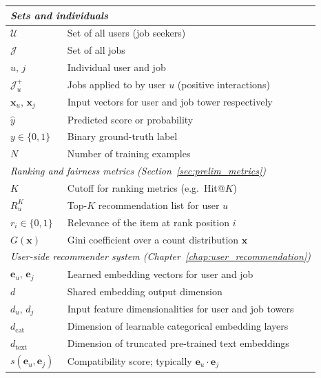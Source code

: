 \begin{longtable}{@{}ll@{}}
    \multicolumn{2}{l}{\textit{Sets and individuals}} \\
    \midrule
    $\mathcal{U}$                  & Set of all users (job seekers) \\
    $\mathcal{J}$                  & Set of all jobs \\
    $u,\, j$                       & Individual user and job \\
    $\mathcal{J}^{+}_u$            & Jobs applied to by user $u$ (positive interactions) \\
    $\mathbf{x}_u,\,\mathbf{x}_j$  & Input vectors for user and job tower respectively \\
    $\hat{y}$                      & Predicted score or probability \\
    $y \in \{0,1\}$                & Binary ground-truth label \\
    $N$                            & Number of training examples \\
    \midrule
    \multicolumn{2}{l}{\textit{Ranking and fairness metrics
        (Section~\ref{sec:prelim_metrics})}} \\
    \midrule
    $K$                            & Cutoff for ranking metrics (e.g.\ Hit@$K$) \\
    $R_u^K$                        & Top-$K$ recommendation list for user $u$ \\
    $r_i \in \{0,1\}$              & Relevance of the item at rank position $i$ \\
    $G(\mathbf{x})$                & Gini coefficient over a count distribution $\mathbf{x}$ \\
    \midrule
    \multicolumn{2}{l}{\textit{User-side recommender system
        (Chapter~\ref{chap:user_recommendation})}} \\
    \midrule
    $\mathbf{e}_u,\,\mathbf{e}_j$  & Learned embedding vectors for user and job \\
    $d$                            & Shared embedding output dimension \\
    $d_u,\,d_j$                    & Input feature dimensionalities for user and job towers \\
    $d_{\text{cat}}$               & Dimension of learnable categorical embedding layers \\
    $d_{\text{text}}$              & Dimension of truncated pre-trained text embeddings \\
    $s(\mathbf{e}_u,\mathbf{e}_j)$ & Compatibility score; typically $\mathbf{e}_u \cdot \mathbf{e}_j$ \\

\end{longtable}
